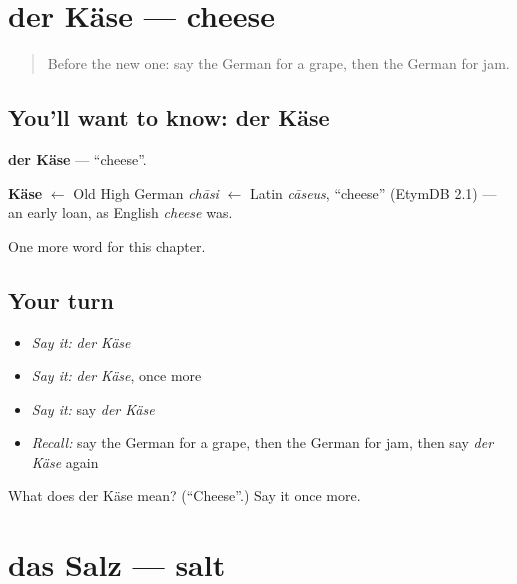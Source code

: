 \section[der Käse]{der Käse — cheese}

\label{lesson:GE-C73-kaese}



\begin{quote}
Before the new one: say the German for a grape, then the German for jam.
\end{quote}

\subsection*{You'll want to know: der Käse}
\textbf{der Käse} — \textquotedblleft{}cheese\textquotedblright{}.

\begin{cousinweb}
\textbf{Käse} $\leftarrow$ Old High German \emph{chāsi} $\leftarrow$ Latin \emph{cāseus}, \textquotedblleft{}cheese\textquotedblright{} (EtymDB 2.1) — an early loan, as English \emph{cheese} was.
\end{cousinweb}

\begin{grammarlens}[title={What you've built}]
One more word for this chapter.
\end{grammarlens}

\subsection*{Your turn}
\begin{itemize}
\raggedright
  \item \emph{Say it:} \emph{der Käse}
  \item \emph{Say it:} \emph{der Käse}, once more
  \item \emph{Say it:} say \emph{der Käse}
  \item \emph{Recall:} say the German for a grape, then the German for jam, then say \emph{der Käse} again
\end{itemize}

\begin{tcolorbox}[breakable,colback=teal!4,colframe=teal!35!black,title={Before you move on}]
What does der Käse mean? (\textquotedblleft{}Cheese\textquotedblright{}.) Say it once more.
\end{tcolorbox}
\section[das Salz]{das Salz — salt}

